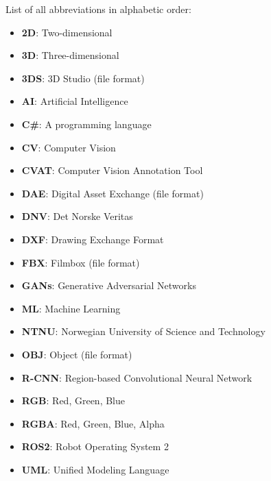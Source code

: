 
List of all abbreviations in alphabetic order:

\begin{itemize}

    \item \textbf{2D}: Two-dimensional
    \item \textbf{3D}: Three-dimensional
    \item \textbf{3DS}: 3D Studio (file format)
    \item \textbf{AI}: Artificial Intelligence
    \item \textbf{C\#}: A programming language
    \item \textbf{CV}: Computer Vision
    \item \textbf{CVAT}: Computer Vision Annotation Tool
    \item \textbf{DAE}: Digital Asset Exchange (file format)
    \item \textbf{DNV}: Det Norske Veritas
    \item \textbf{DXF}: Drawing Exchange Format
    \item \textbf{FBX}: Filmbox (file format)
    \item \textbf{GANs}: Generative Adversarial Networks
    \item \textbf{ML}: Machine Learning
    \item \textbf{NTNU}: Norwegian University of Science and Technology
    \item \textbf{OBJ}: Object (file format)
     \item \textbf{R-CNN}: Region-based Convolutional Neural Network
     \item \textbf{RGB}: Red, Green, Blue
    \item \textbf{RGBA}: Red, Green, Blue, Alpha
    \item \textbf{ROS2}: Robot Operating System 2
    \item \textbf{UML}: Unified Modeling Language
\end{itemize}
    
    